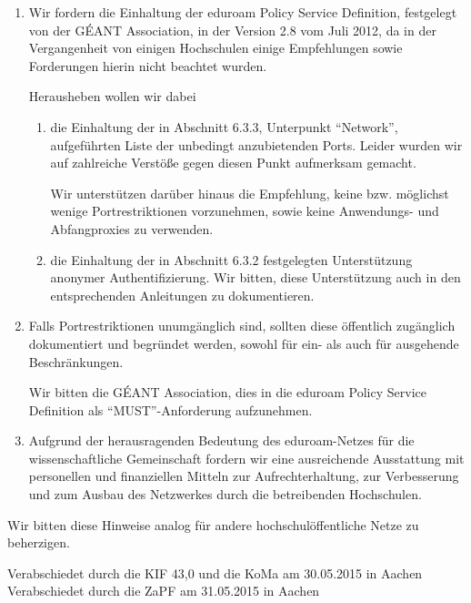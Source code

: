 \documentclass[DIV=calc]{scrartcl}
\begin{document}
\begin{enumerate}
\item Wir fordern die Einhaltung der eduroam Policy Service Definition,
  festgelegt von der GÉANT Association, in der Version 2.8 vom Juli 2012, da
  in der Vergangenheit von einigen Hochschulen einige Empfehlungen sowie
  Forderungen hierin nicht beachtet wurden.

  Herausheben wollen wir dabei
  \begin{enumerate}
  \item  die Einhaltung der in Abschnitt 6.3.3, Unterpunkt ``Network'',
    aufgeführten Liste der unbedingt anzubietenden Ports. Leider wurden wir
    auf zahlreiche Verstöße gegen diesen Punkt aufmerksam gemacht.

    Wir unterstützen darüber hinaus die Empfehlung, keine
    bzw. möglichst wenige Portrestriktionen vorzunehmen, sowie keine
    Anwendungs- und Abfangproxies zu verwenden.

  \item die Einhaltung der in Abschnitt 6.3.2 festgelegten Unterstützung
    anonymer Authentifizierung. Wir bitten, diese Unterstützung auch in den
    entsprechenden Anleitungen zu dokumentieren.
  \end{enumerate}
\item Falls Portrestriktionen unumgänglich sind, sollten diese öffentlich
  zugänglich dokumentiert und begründet werden, sowohl für ein- als auch für
  ausgehende Beschränkungen.

  Wir bitten die GÉANT Association, dies in die eduroam Policy Service Definition
  als ``MUST''-Anforderung aufzunehmen.

\item Aufgrund der herausragenden Bedeutung des eduroam-Netzes für die
  wissenschaftliche Gemeinschaft fordern wir eine ausreichende Ausstattung mit
  personellen und finanziellen Mitteln zur Aufrechterhaltung, zur Verbesserung
  und zum Ausbau des Netzwerkes durch die betreibenden Hochschulen.
\end{enumerate}

Wir bitten diese Hinweise analog für andere hochschulöffentliche Netze zu
beherzigen.

\vfill
\begin{flushright}
Verabschiedet durch die KIF 43,0 und die KoMa am 30.05.2015 in Aachen \\
Verabschiedet durch die ZaPF am 31.05.2015 in Aachen
\end{flushright}
\end{document}
